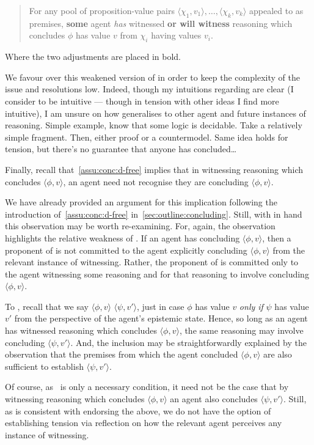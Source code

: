 \begin{note}
{\begin{quote}
      For any pool of proposition-value pairs \(\langle \chi_{1},v_{1} \rangle,\dots,\langle \chi_{k},v_{k} \rangle\) appealed to as premises, \textbf{some} agent \emph{has} witnessed \textbf{or will witness} reasoning which concludes \(\phi\) has value \(v\) from \(\chi_{i}\) having values \(v_{i}\).
    \end{quote}
    Where the two adjustments are placed in bold.

    We favour \ESU{} over this weakened version of \ESU{} in order to keep the complexity of the issue and resolutions low.
    Indeed, though my intuitions regarding \ESU{} are clear (I consider \ESU{} to be intuitive --- though in tension with other ideas I find more intuitive), I am unsure on how \ESU{} generalises to other agent and future instances of reasoning.
    {
      \color{red}
      Simple example, know that some logic is decidable.
      Take a relatively simple fragment.
      Then, either proof or a countermodel.
      Same idea holds for tension, but there's no guarantee that anyone has concluded\dots
    }
  }
\end{note}

\begin{note}
  Finally, recall that~\autoref{assu:conc:d-free} implies that in witnessing reasoning which concludes \(\langle \phi,v \rangle\), an agent need not recognise they are concluding \(\langle \phi,v \rangle\).

  We have already provided an argument for this implication following the introduction of~\autoref{assu:conc:d-free} in~\autoref{sec:outline:concluding}.
  Still, with \ESU{} in hand this observation may be worth re-examining.
  For, again, the observation highlights the relative weakness of \ESU{}.
  If an agent has concluding \(\langle \phi,v \rangle\), then a proponent of \ESU{} is not committed to the agent explicitly concluding \(\langle \phi,v \rangle\) from the relevant instance of witnessing.
  Rather, the proponent of \ESU{} is committed only to the agent witnessing some reasoning and for that reasoning to involve concluding \(\langle \phi,v \rangle\).

  To \illu{}, recall that we say \(\langle \phi,v \rangle\) \indicatePr{} \(\langle \psi,v' \rangle\), just in case \(\phi\) has value \(v\) \emph{only if} \(\psi\) has value \(v'\) from the perspective of the agent's epistemic state.
  Hence, so long as an agent has witnessed reasoning which concludes \(\langle \phi,v \rangle\), the same reasoning may involve concluding \(\langle \psi,v' \rangle\).
  And, the inclusion may be straightforwardly explained by the observation that the premises from which the agent concluded \(\langle \phi,v \rangle\) are also sufficient to establish \(\langle \psi,v' \rangle\).

  Of course, as~\ESU{} is only a necessary condition, it need not be the case that by witnessing reasoning which concludes \(\langle \phi,v \rangle\) an agent also concludes \(\langle \psi,v' \rangle\).
  Still, as \ESU{} is consistent with endorsing the above, we do not have the option of establishing tension via reflection on how the relevant agent perceives any instance of witnessing.
\end{note}

